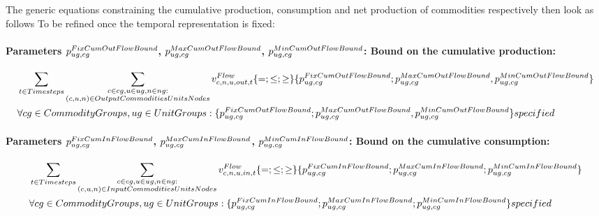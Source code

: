  The generic equations constraining the cumulative production, consumption and net production of commodities respectively then look as follows {\color{red} To be refined once the temporal representation is fixed}: 

\paragraph{Parameters $\pFixCumOutFlowBound$, $\pMaxCumOutFlowBound$, $\pMinCumOutFlowBound$: Bound on the cumulative production:}
\begin{align} \label{eq:cumoutflowbound}
&\sum_{\timesteps} \sum_{\substack{\commodity \in \commoditygroup, \unit \in \unitgroup, \node \in \nodegroup: \\ \OutputCommoditiesUnitsNodes}} \vFlow[\commodity,\node,\unit,out,\timestep]  \{=;\le;\ge\} \{\pFixCumOutFlowBound ; \pMaxCumOutFlowBound , \pMinCumOutFlowBound \} \nonumber \\
&\forall \commoditygroups, \unitgroups: \{\pFixCumOutFlowBound ; \pMaxCumOutFlowBound , \pMinCumOutFlowBound \} specified
\end{align}

\paragraph{Parameters $\pFixCumInFlowBound$, $\pMaxCumInFlowBound$, $\pMinCumInFlowBound$: Bound on the cumulative consumption:}
\begin{align} \label{eq:cuminflowbound}
&\sum_{\timesteps} \sum_{\substack{\commodity \in \commoditygroup, \unit \in \unitgroup, \node \in \nodegroup: \\ \InputCommoditiesUnitsNodes}} \vFlow[\commodity,\node,\unit,in,\timestep]  \{=;\le;\ge\} \{\pFixCumInFlowBound ; \pMaxCumInFlowBound ; \pMinCumInFlowBound \} \nonumber \\
&\forall \commoditygroups, \unitgroups : \{\pFixCumInFlowBound ; \pMaxCumInFlowBound ; \pMinCumInFlowBound \} specified
\end{align}

